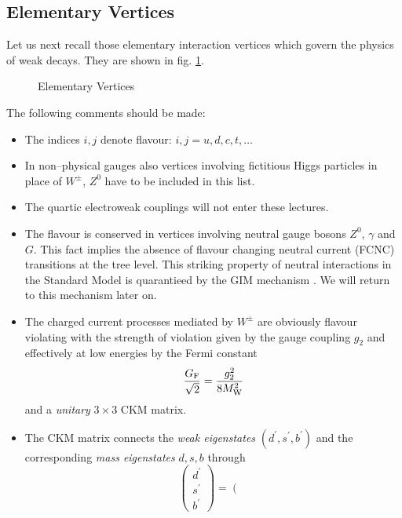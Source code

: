 \documentclass[12pt]{article}
\newcommand{\mw}{M_{\rm W}}
\begin{document}
\subsection{Elementary Vertices }
Let us next recall those elementary interaction vertices which govern
the physics of weak decays. They are shown in fig. \ref{fig:1}.
\begin{figure}[hbt]
\vspace{0.10in}
\centerline{
\epsfysize=3in
}
\vspace{0.08in}
\caption[]{
Elementary Vertices
\label{fig:1}}
\end{figure}
The following comments should be made:
\begin{itemize}
\item
The indices $i,j$ denote flavour: $i,j = u,d,c,t,\ldots$
\item
In non--physical gauges also vertices involving fictitious
Higgs particles in place of $W^{\pm}$, $Z^0$ have to be included in
this list.
\item
The quartic
electroweak couplings will not enter these lectures.
\item
The flavour is conserved in vertices involving neutral gauge bosons
$Z^0$, $\gamma$ and $G$. This fact implies the absence of flavour
changing neutral current (FCNC) transitions at the tree level. 
This striking property of neutral interactions in the Standard
Model is quarantieed by the {\rm GIM} mechanism \cite{GIM1}. 
We will return
to this mechanism later on.
\item
The charged current processes mediated by $W^{\pm}$ are
obviously flavour violating with the strength of violation given by
the gauge coupling $g_2$  and effectively at low energies 
by the Fermi constant 
\begin{equation}\label{2.100}
\frac{G_{\rm F}}{\sqrt{2}}=\frac{g^2_2}{8 \mw^2}
\end{equation}
and a {\it unitary} $3\times3$
{\rm CKM} matrix. 
\item
The {\rm CKM} matrix \cite{CAB,KM,GIM1} connects the {\it weak
eigenstates} $(d^\prime,s^\prime,b^\prime)$ and the corresponding {\it mass 
eigenstates} $d,s,b$ through
\begin{equation}\label{2.67}
\left(\begin{array}{c}
d^\prime \\ s^\prime \\ b^\prime
\end{array}\right)=
\left(\begin{array}{ccc}

\end{array}
\end{equation}
\end{itemize}
\end{document}
